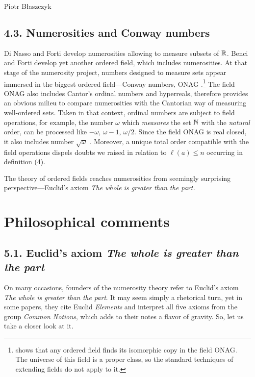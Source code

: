 \begin{artengenv}{Piotr Błaszczyk}
\subsection{4.3. Numerosities and Conway numbers}
Di Nasso and Forti \parencite*{ref_DF10} develop numerosities allowing to measure subsets of ${\mathbb{R}}$. 
Benci and Forti \parencite*{ref_BF17} develop yet another ordered field, which includes numerosities. At that stage of the numerosity project, numbers designed to measure sets appear immersed in the biggest ordered field---Conway numbers, ONAG \parencite[see][21]{ref_BF17}.\footnote{\parencite{ref_pe} shows that any ordered field finds its isomorphic copy in the field ONAG. The universe of this field is a proper class, so the standard techniques of extending fields do not apply to it.}  The field ONAG also includes Cantor's ordinal numbers and hyperreals, therefore provides an obvious milieu to compare numerosities with the Cantorian way of measuring well-ordered sets. Taken in that context,  ordinal numbers are subject to field operations, for example, the number $\omega$ which \textit{measures} the set ${\mathbb{N}}$ with the \textit{natural} order, can be processed like $-\omega$, $\omega-1$, $\omega/2$. Since the field ONAG is real closed, it also includes number $\sqrt{\omega}$ \parencite[see][\S\,8]{ref_bf}. Moreover, a unique total order compatible with the field operations dispels doubts we raised in relation to $\ell (a)\leq n$ occurring in definition (4).

The theory of ordered fields reaches numerosities from seemingly surprising perspective---Euclid's axiom \textit{The whole is greater than the part.}   
\section{Philosophical comments}
\vspace*{-30pt}
\subsection{5.1. Euclid's axiom \textit{The whole is greater than the part}}


On many occasions, founders of the numerosity theory refer to Euclid's axiom \textit{The whole is greater than the part}. It may seem simply a rhetorical turn, yet in some papers, they cite Euclid \textit{Elements} and interpret all five axioms from the group \textit{Common Notions}, which adds to their notes a flavor of gravity.  So, let us take a closer look at it.


\end{artengenv}
